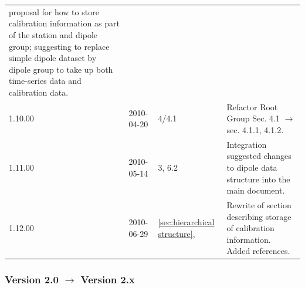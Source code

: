 \documentclass[a4paper,10pt,bibtotoc]{scrartcl}
\begin{document}
\begin{center}
\begin{supertabular}{lllp{9.5cm}}
    proposal for how to store calibration information as part of the
    station and dipole group; suggesting to replace simple dipole
    dataset by dipole group to take up both time-series data and
    calibration data. \\
    1.10.00 & 2010-04-20 & 4/4.1 & Refactor Root Group  Sec. 4.1
    $\rightarrow$ sec. 4.1.1, 4.1.2. \\
    1.11.00 & 2010-05-14 & 3, 6.2 & Integration suggested changes to dipole
    data structure into the main document. \\
    1.12.00 & 2010-06-29 & \ref{sec:hierarchical structure}, & Rewrite of section
    describing storage of calibration information. Added references. \\
  \end{supertabular}
\end{center}

\subsubsection*{Version 2.0 $\rightarrow$ Version 2.x}
\end{document}
